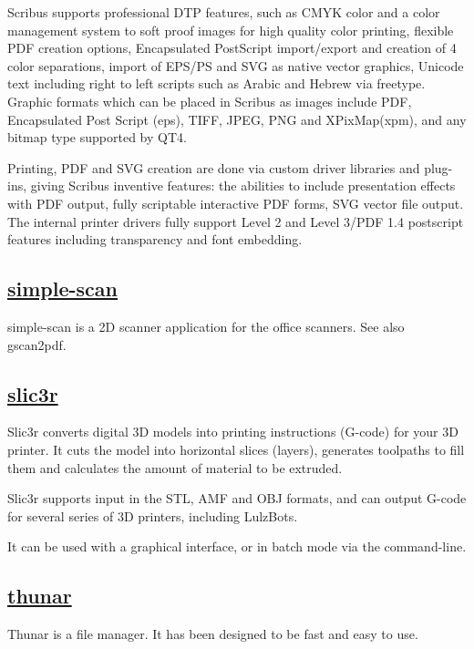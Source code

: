  Scribus supports professional DTP features, such as CMYK color and a
 color management system to soft proof images for high quality color printing,
 flexible PDF creation options, Encapsulated PostScript import/export and
 creation of 4 color separations, import of EPS/PS and SVG as native vector
 graphics, Unicode text including right to left scripts such as Arabic and
 Hebrew via freetype. Graphic formats which can be placed in Scribus as images
 include PDF, Encapsulated Post Script (eps), TIFF, JPEG, PNG and XPixMap(xpm),
 and any bitmap type supported by QT4.
 
 Printing, PDF and SVG creation are done via custom driver libraries and
 plug-ins, giving Scribus inventive features: the abilities to include
 presentation effects with PDF output, fully scriptable interactive PDF
 forms, SVG vector file output. The internal printer drivers fully support
 Level 2 and Level 3/PDF 1.4 postscript features including transparency and
 font embedding.
 
\subsection{\href{https://launchpad.net/simple-scan}{simple-scan}}

simple-scan is a 2D scanner application for the office scanners. See also
gscan2pdf.

\subsection{\href{http://slic3r.org/}{slic3r}}

 Slic3r converts digital 3D models into printing instructions (G-code)
 for your 3D printer. It cuts the model into horizontal slices (layers),
 generates toolpaths to fill them and calculates the amount of material
 to be extruded.
 
 Slic3r supports input in the STL, AMF and OBJ formats, and can output
 G-code for several series of 3D printers, including LulzBots.
 
 It can be used with a graphical interface, or in batch mode via the
 command-line.

\subsection{\href{http://thunar.xfce.org}{thunar}}

 Thunar is a file manager.
 It has been designed to be fast and easy to use.
 
